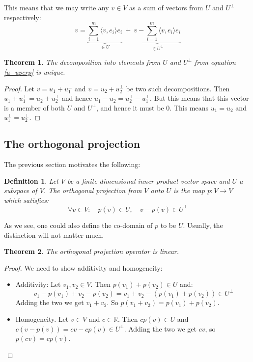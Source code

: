 \documentclass[12pt, a4paper]{article}
\newtheorem{theorem}{Theorem}[section]
\newtheorem{definition}{Definition}[section]
\numberwithin{equation}{section}
\begin{document}
This means that we may write any $v\in V$ as a sum of vectors from $U$ and $U^\perp$ respectively:
\begin{equation}
\label{u_uperp}
v=\underbrace{\sum_{i=1}^m\langle v,e_i\rangle e_i}_{\in U}\ +\ \underbrace{v-\sum_{i=1}^m\langle v,e_i\rangle e_i}_{\in U^\perp}
\end{equation}

\begin{theorem}
The decomposition into elements from $U$ and $U^\perp$ from equation \ref{u_uperp} is unique.
\end{theorem}
\begin{proof}
Let $v=u_1+u^\perp_1$ and $v=u_2+u^\perp_2$ be two such decompositions. Then $u_1+u^\perp_1=u_2+u^\perp_2$ and hence $u_1-u_2=u^\perp_2-u^\perp_1$. But this means that this vector is a member of both $U$ and $U^\perp$, and hence it must be $0$. This means $u_1=u_2$ and $u^\perp_1=u^\perp_2$.
\end{proof}

\subsection{The orthogonal projection}
The previous section motivates the following:
\begin{definition}
Let $V$ be a finite-dimensional inner product vector space and $U$ a subspace of $V$. The orthogonal projection from $V$ onto $U$ is the map $p:V\rightarrow V$ which satisfies:
\begin{equation}
\forall v\in V:\quad p(v)\in U,\quad v-p(v)\in U^\perp
\end{equation}
\end{definition}
As we see, one could also define the co-domain of $p$ to be $U$. Usually, the distinction will not matter much.

\begin{theorem}
The orthogonal projection operator is linear.
\end{theorem}
\begin{proof}
We need to show additivity and homogeneity:
\begin{itemize}
\item Additivity: Let $v_1,v_2\in V$. Then $p(v_1)+p(v_2)\in U$ and:
\begin{equation}
v_1-p(v_1)+v_2-p(v_2)=v_1+v_2-(p(v_1)+p(v_2))\in U^\perp
\end{equation}
Adding the two we get $v_1+v_2$. So $p(v_1+v_2)=p(v_1)+p(v_2)$.
\item Homogeneity. Let $v\in V$ and $c\in\mathbb{R}$. Then $cp(v)\in U$ and $c(v-p(v))=cv-cp(v)\in U^\perp$. Adding the two we get $cv$, so $p(cv)=cp(v)$. 
\end{itemize}
\end{proof}
\end{document}
